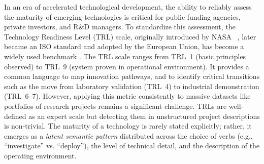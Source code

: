 \documentclass[runningheads]{llncs}
\begin{document}
In an era of accelerated technological development, the ability to reliably assess
the maturity of emerging technologies is critical for public funding agencies,
private investors, and R\&D managers. To standardize this assessment, the
Technology Readiness Level (TRL) scale, originally introduced by NASA
~\cite{mankins1995}, later became an ISO standard and adopted by the European Union, has become a
widely used benchmark \cite{Heder2017TRL}. 
The TRL scale ranges from TRL~1 (basic principles observed) to TRL~9 (system
proven in operational environment). It provides a common language to map
innovation pathways, and to identify critical transitions such as the move from
laboratory validation (TRL~4) to industrial demonstration (TRL~6--7). However,
applying this metric consistently to massive datasets like portfolios of research projects remains a significant challenge.
TRLs are well-defined as an expert scale but detecting them
in unstructured project descriptions is non-trivial.
The maturity of a technology is rarely stated explicitly; rather, it emerges as a
\emph{latent semantic pattern} distributed across the choice of verbs
(e.g., ``investigate'' vs. ``deploy''), the level of technical detail, and the
description of the operating environment.
\end{document}
